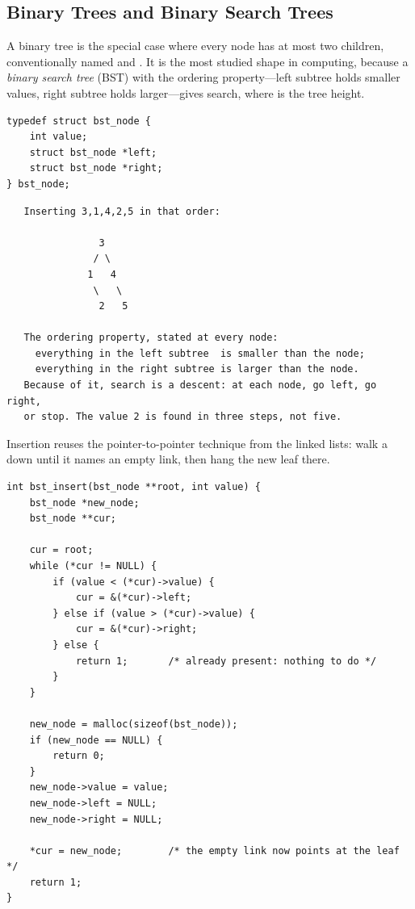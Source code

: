 \subsection{Binary Trees and Binary Search Trees}

A binary tree is the special case where every node has at most two
children, conventionally named  and . It is the
most studied shape in computing, because a \emph{binary search tree}
(BST) with the ordering property---left subtree holds smaller values,
right subtree holds larger---gives  search, where
 is the tree height.

\begin{lstlisting}[caption={The BST node.}]
typedef struct bst_node {
    int value;
    struct bst_node *left;
    struct bst_node *right;
} bst_node;
\end{lstlisting}

\begin{verbatim}
   Inserting 3,1,4,2,5 in that order:

                3
               / \
              1   4
               \   \
                2   5

   The ordering property, stated at every node:
     everything in the left subtree  is smaller than the node;
     everything in the right subtree is larger than the node.
   Because of it, search is a descent: at each node, go left, go right,
   or stop. The value 2 is found in three steps, not five.
\end{verbatim}

Insertion reuses the pointer-to-pointer technique from the linked
lists: walk a  down until it names an empty link,
then hang the new leaf there.

\begin{lstlisting}[caption={Insert: descend to an empty link and hang a leaf.}]
int bst_insert(bst_node **root, int value) {
    bst_node *new_node;
    bst_node **cur;

    cur = root;
    while (*cur != NULL) {
        if (value < (*cur)->value) {
            cur = &(*cur)->left;
        } else if (value > (*cur)->value) {
            cur = &(*cur)->right;
        } else {
            return 1;       /* already present: nothing to do */
        }
    }

    new_node = malloc(sizeof(bst_node));
    if (new_node == NULL) {
        return 0;
    }
    new_node->value = value;
    new_node->left = NULL;
    new_node->right = NULL;

    *cur = new_node;        /* the empty link now points at the leaf */
    return 1;
}
\end{lstlisting}

